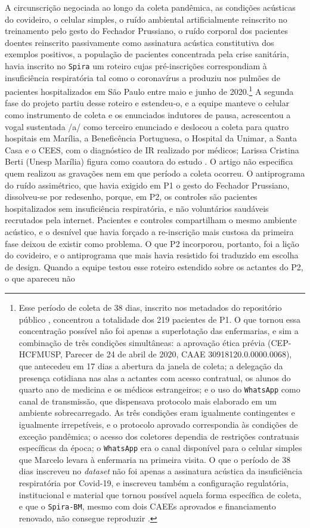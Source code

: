 A circunscrição negociada ao longo da coleta pandêmica, as condições acústicas do covideiro, o celular simples, o ruído ambiental artificialmente reinscrito no treinamento pelo gesto do Fechador Prussiano, o ruído corporal dos pacientes doentes reinscrito passivamente como assinatura acústica constitutiva dos exemplos positivos, a população de pacientes concentrada pela crise sanitária, havia inscrito no \texttt{Spira} um roteiro cujas pré-inscrições correspondiam à insuficiência respiratória tal como o coronavírus a produziu nos pulmões de pacientes hospitalizados em São Paulo entre maio e junho de 2020.\footnote{Esse período de coleta de 38 dias, inscrito nos metadados do repositório público \parencite{Casanova2021DeepLearning}, concentrou a totalidade dos 219 pacientes de P1. O que tornou essa concentração possível não foi apenas a superlotação das enfermarias, e sim a combinação de três condições simultâneas: a aprovação ética prévia (CEP-HCFMUSP, Parecer de 24 de abril de 2020, CAAE 30918120.0.0000.0068), que antecedeu em 17 dias a abertura da janela de coleta; a delegação da presença cotidiana nas alas a actantes com acesso contratual, os alunos do quarto ano de medicina e os médicos estrangeiros; e o uso do \texttt{WhatsApp} como canal de transmissão, que dispensava protocolo mais elaborado em um ambiente sobrecarregado. As três condições eram igualmente contingentes e igualmente irrepetíveis, e o protocolo aprovado correspondia às condições de exceção pandêmica; o acesso dos coletores dependia de restrições contratuais específicas da época; o \texttt{WhatsApp} era o canal disponível para o celular simples que Marcelo levara à enfermaria na primeira visita. O que o período de 38 dias inscreveu no \textit{dataset} não foi apenas a assinatura acústica da insuficiência respiratória por Covid-19, e inscreveu também a configuração regulatória, institucional e material que tornou possível aquela forma específica de coleta, e que o \texttt{Spira-BM}, mesmo com dois CAEEs aprovados e financiamento renovado, não consegue reproduzir \parencite{Finger2025SPIRABM}.} A segunda fase do projeto partiu desse roteiro e estendeu-o, e a equipe manteve o celular como instrumento de coleta e os enunciados indutores de pausa, acrescentou a vogal sustentada /a/ como terceiro enunciado e deslocou a coleta para quatro hospitais em Marília, a Beneficência Portuguesa, o Hospital da Unimar, a Santa Casa e o CEES, com o diagnóstico de IR realizado por médicos; Larissa Cristina Berti (Unesp Marília) figura como coautora do estudo \parencite{Gauy2024Discriminant}. O artigo não especifica quem realizou as gravações nem em que período a coleta ocorreu. O antiprograma do ruído assimétrico, que havia exigido em P1 o gesto do Fechador Prussiano, dissolveu-se por redesenho, porque, em P2, os controles são pacientes hospitalizados sem insuficiência respiratória, e não voluntários saudáveis recrutados pela internet. Pacientes e controles compartilham o mesmo ambiente acústico, e o desnível que havia forçado a re-inscrição mais custosa da primeira fase deixou de existir como problema. O que P2 incorporou, portanto, foi a lição do covideiro, e o antiprograma que mais havia resistido foi traduzido em escolha de design. Quando a equipe testou esse roteiro estendido sobre os actantes do P2, o que apareceu não 
